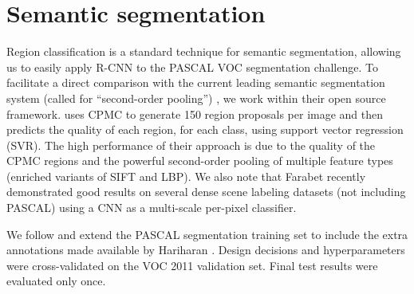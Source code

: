 \section{Semantic segmentation}

Region classification is a standard technique for semantic segmentation, allowing us to easily apply R-CNN to the PASCAL VOC segmentation challenge.
To facilitate a direct comparison with the current leading semantic segmentation system (called \OtwoP for ``second-order pooling'') \cite{o2p}, we work within their open source framework.
\OtwoP uses CPMC to generate 150 region proposals per image and then predicts the quality of each region, for each class, using support vector regression (SVR).
The high performance of their approach is due to the quality of the CPMC regions and the powerful second-order pooling of multiple feature types (enriched variants of SIFT and LBP).
We also note that Farabet \etal \cite{farabet-pami-13} recently demonstrated good results on several dense scene labeling datasets (not including PASCAL) using a CNN as a multi-scale per-pixel classifier.

We follow \cite{arbelaez2012semantic,o2p} and extend the PASCAL segmentation training set to include the extra annotations made available by Hariharan \etal \cite{hariharan2012inverse}. 
Design decisions and hyperparameters were cross-validated on the VOC 2011 validation set. Final test results were evaluated only once.

